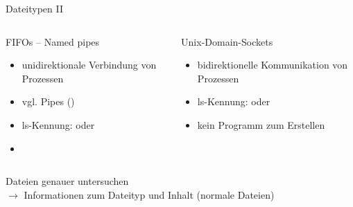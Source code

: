 \documentclass[aspectratio=43]{beamer}
\begin{document}
\begin{frame}{Dateitypen II}
  \begin{columns}
    \begin{column}{0.5\textwidth}
      \begin{block}{FIFOs -- Named pipes}
        \begin{itemize}
	  \item unidirektionale Verbindung von Prozessen
          \item vgl. Pipes (\textbar)
          \item ls-Kennung:  oder \co{\textbar}
          \item {}
        \end{itemize}
      \end{block}
    \end{column}
    \begin{column}{0.5\textwidth}
       \begin{block}{Unix-Domain-Sockets}
            \begin{itemize}
              \item bidirektionelle Kommunikation von Prozessen
	      \item ls-Kennung:  oder \co{=}
              \item kein Programm zum Erstellen
            \end{itemize}
        \end{block}
    \end{column}
  \end{columns}
  \begin{exampleblock}{Dateien genauer untersuchen}
    \\
    $\rightarrow$ Informationen zum Dateityp und Inhalt (normale Dateien)
  \end{exampleblock}

\end{frame}
\end{document}
